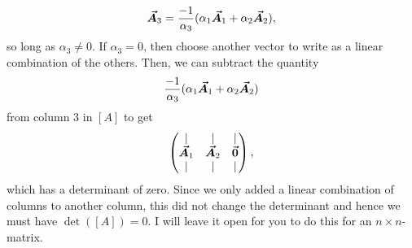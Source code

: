 \documentclass[12pt]{article} %
\begin{document}
\begin{solution}
\begin{enumerate}[(a)]
\[
\boldsymbol{\vec{A}}_3 = \frac{-1}{\alpha_3} (\alpha_1 \boldsymbol{\vec{A}}_1 + \alpha_2 \boldsymbol{\vec{A}}_2),
\]
so long as $\alpha_3\neq 0$.  If $\alpha_3 = 0$, then choose another vector to write as a linear combination of the others. Then, we can subtract the quantity
\[
\frac{-1}{\alpha_3} (\alpha_1 \boldsymbol{\vec{A}}_1 + \alpha_2 \boldsymbol{\vec{A}}_2)
\]
from column 3 in $[A]$ to get
\[
\begin{pmatrix} \vert & \vert & \vert \\ \boldsymbol{\vec{A}}_1 & \boldsymbol{\vec{A}}_2 & \boldsymbol{\vec{0}} \\ \vert & \vert & \vert \end{pmatrix},
\]
which has a determinant of zero. Since we only added a linear combination of columns to another column, this did not change the determinant and hence we must have $\det([A])=0$. I will leave it open for you to do this for an $n\times n$-matrix.
\end{enumerate}
\end{solution}
\end{document}
